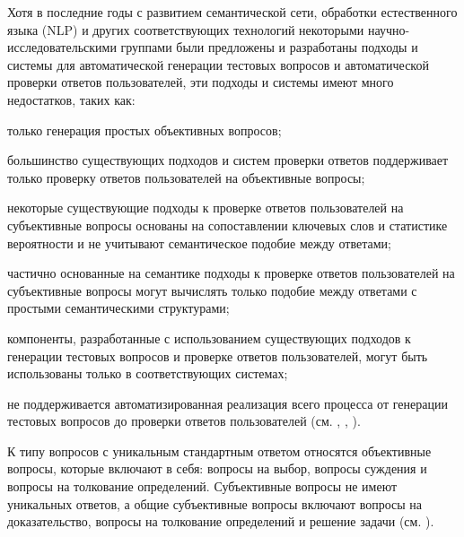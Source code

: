 Хотя в последние годы с развитием семантической сети, обработки естественного языка (NLP) и других соответствующих технологий некоторыми научно-исследовательскими группами были предложены и разработаны подходы и системы для автоматической генерации тестовых вопросов и автоматической проверки ответов пользователей, эти подходы и системы имеют много недостатков, таких как:

\begin{textitemize}
	\item только генерация простых объективных вопросов;
	\item большинство существующих подходов и систем проверки ответов поддерживает только проверку ответов пользователей на объективные вопросы;
	\item некоторые существующие подходы к проверке ответов пользователей на субъективные вопросы основаны на сопоставлении ключевых слов и статистике вероятности и не учитывают семантическое подобие между ответами;
	\item частично основанные на семантике подходы к проверке ответов пользователей на субъективные вопросы могут вычислять только подобие между ответами с простыми семантическими структурами;
	\item компоненты, разработанные с использованием существующих подходов к генерации тестовых вопросов и проверке ответов пользователей, могут быть использованы только в соответствующих системах;
	\item не поддерживается автоматизированная реализация всего процесса от генерации тестовых вопросов до проверки ответов пользователей (см. , , ).
\end{textitemize}

К типу вопросов с уникальным стандартным ответом относятся объективные вопросы, которые включают в себя: вопросы на выбор, вопросы суждения и вопросы на толкование определений. Субъективные вопросы не имеют уникальных ответов, а общие субъективные вопросы включают вопросы на доказательство, вопросы на толкование определений и решение задачи (см. ).

